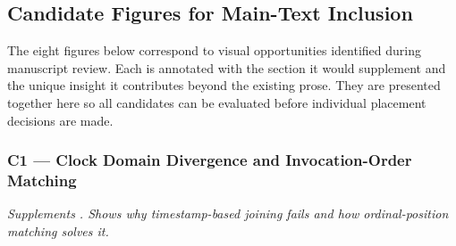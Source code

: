 
\subsection{Candidate Figures for Main-Text Inclusion}
\label{sec:appendix:candidates}

The eight figures below correspond to visual opportunities identified during manuscript
review.  Each is annotated with the section it would supplement and the unique insight
it contributes beyond the existing prose.  They are presented together here so all
candidates can be evaluated before individual placement decisions are made.


\subsubsection*{C1 --- Clock Domain Divergence and Invocation-Order Matching}
\noindent\textit{Supplements .  Shows why timestamp-based
joining fails and how ordinal-position matching solves it.}

